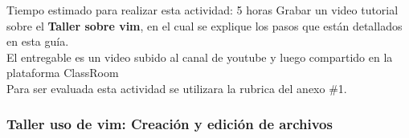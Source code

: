 \documentclass[a4paper,12pt,spanish]{article}
\begin{document}
\newpage
\begin{tcolorbox}[skin=widget,
boxrule=1mm,
coltitle=black,
colframe=blue!45!white,
colback=blue!15!white,
width=(1\linewidth),before=\hfill,after=\hfill,
adjusted title={{\Large Actividad C1-2}:\textbf{Taller sobre el uso de vim}}]
Tiempo estimado para realizar esta actividad: 5 horas
\tcblower
Grabar un video tutorial sobre el  \textbf{Taller sobre vim}, en el cual se explique los pasos que están detallados en esta guía.\\ 

El entregable es un video subido al canal de youtube y luego compartido en la plataforma ClassRoom \\

Para ser evaluada esta actividad se utilizara la rubrica del anexo \#1.


\end{tcolorbox}



\subsubsection{Taller uso de vim: Creación y edición de archivos}
\label{sec:ejerc-pract-con}
\end{document}
